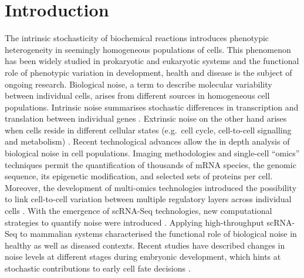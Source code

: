 
\chapter{Introduction}  

\vspace{-1cm}

\graphicspath{{"../../Dropbox (Cambridge  University)/Figures_for_thesis/Introduction/"}}

\begin{Abstract}
\hspace{-5mm} The intrinsic stochasticity of biochemical reactions introduces phenotypic heterogeneity in seemingly homogeneous populations of cells. 
This phenomenon has been widely studied in prokaryotic and eukaryotic systems and the functional role of phenotypic variation in development, health and disease is the subject of ongoing research. 
Biological noise, a term to describe molecular variability between individual cells, arises from different sources in homogeneous cell populations. 
Intrinsic noise summarises stochastic differences in transcription and translation between individual genes \citep{Elowitz2002, Raser2004, Sanchez2013}. 
Extrinsic noise on the other hand arises when cells reside in different cellular states (e.g.~cell cycle, cell-to-cell signalling and metabolism)  \citep{Zopf2013, Iwamoto2016, Kiviet2014}. 
Recent technological advances allow the in depth analysis of biological noise in cell populations. 
Imaging methodologies \citep{Chen2015} and single-cell “omics” techniques \citep{Bock2016} permit the quantification of thousands of mRNA species, the genomic sequence, its epigenetic modification, and selected sets of proteins per cell. 
Moreover, the development of multi-omics technologies introduced the possibility to link cell-to-cell variation between multiple regulatory layers across individual cells \citep{Macaulay2017}. 
With the emergence of \gls{scRNA-Seq} technologies, new computational strategies to quantify noise were introduced \cite{Brennecke2013, Vallejos2015BASiCS, Kolodziejczyk2015cell, Buettner2015, Fan2016, Richard2016}. 
Applying high-throughput scRNA-Seq to mammalian systems characterised the functional role of biological noise in healthy as well as diseased contexts. 
Recent studies have described changes in noise levels at different stages during embryonic development, which hints at stochastic contributions to early cell fate decisions \citep{Goolam2016, Mohammed2017, Ohnishi2014}. 

\end{Abstract}

